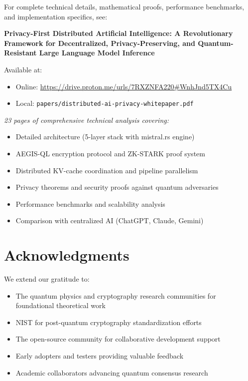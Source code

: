 \documentclass[11pt,a4paper]{article}
\begin{document}
For complete technical details, mathematical proofs, performance benchmarks, and implementation specifics, see:

\begin{tcolorbox}[colback=quantumblue!10,colframe=quantumblue,title=\textbf{Companion Whitepaper}]
\textbf{Privacy-First Distributed Artificial Intelligence: A Revolutionary Framework for Decentralized, Privacy-Preserving, and Quantum-Resistant Large Language Model Inference}

Available at:
\begin{itemize}
    \item Online: \url{https://drive.proton.me/urls/7RXZNFA220#WnhJnd5TX4Cu}
    \item Local: \texttt{papers/distributed-ai-privacy-whitepaper.pdf}
\end{itemize}

\textit{23 pages of comprehensive technical analysis covering:}
\begin{itemize}
    \item Detailed architecture (5-layer stack with mistral.rs engine)
    \item AEGIS-QL encryption protocol and ZK-STARK proof system
    \item Distributed KV-cache coordination and pipeline parallelism
    \item Privacy theorems and security proofs against quantum adversaries
    \item Performance benchmarks and scalability analysis
    \item Comparison with centralized AI (ChatGPT, Claude, Gemini)
\end{itemize}
\end{tcolorbox}

\section*{Acknowledgments}

We extend our gratitude to:
\begin{itemize}
    \item The quantum physics and cryptography research communities for foundational theoretical work
    \item NIST for post-quantum cryptography standardization efforts
    \item The open-source community for collaborative development support
    \item Early adopters and testers providing valuable feedback
    \item Academic collaborators advancing quantum consensus research
\end{itemize}
\end{document}
